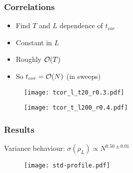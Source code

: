 \begin{frame}
    \frametitle{Correlations}
    \begin{itemize}
        \item Find $T$ and $L$ dependence of $t_{cor}$
        \item Constant in $L$
        \item Roughly $\order{T}$ 
        \item So $t_{cor} = \order{N}$ (in sweeps)
    \end{itemize}
    \begin{figure}
        \centering
        \begin{minipage}{0.49\linewidth}
            \centering
            \texttt{[image: tcor\_l\_t20\_r0.3.pdf]}
        \end{minipage}
        \hfill
        \begin{minipage}{0.49\linewidth}
            \centering
            \texttt{[image: tcor\_t\_l200\_r0.4.pdf]}
        \end{minipage}
    \end{figure}
\end{frame}


\begin{frame}
    \frametitle{Results}
    Variance behaviour: $\sigma(\rho_L) \propto N^{0.50 \pm 0.01}$
    \begin{figure}[b]
        \centering
        \texttt{[image: std-profile.pdf]}
    \end{figure}
\end{frame}
